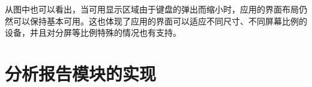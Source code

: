 \begin{figure}[ht]
    \centering
    \label{fig:history-time-picker}
\end{figure}

从图中也可以看出，当可用显示区域由于键盘的弹出而缩小时，应用的界面布局仍然可以保持基本可用。这也体现了应用的界面可以适应不同尺寸、不同屏幕比例的设备，并且对分屏等比例特殊的情况也有支持。



\section{分析报告模块的实现}\label{sec:analytics}

